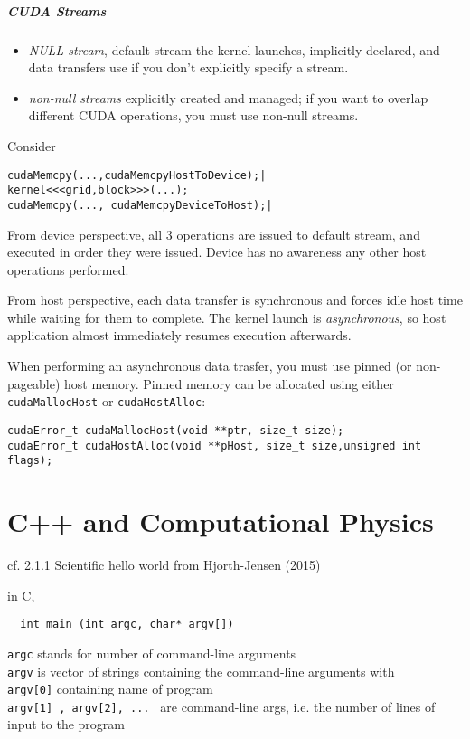 \documentclass[10pt]{amsart}
\begin{document}
\begin{multicols*}{2}
\subsubsection{CUDA Streams}
\begin{itemize}
	\item \emph{NULL stream}, default stream the kernel launches, implicitly declared, and data transfers use if you don't explicitly specify a stream.  
	\item \emph{non-null streams} explicitly created and managed; if you want to overlap different CUDA operations, you must use non-null streams.  
\end{itemize}

Consider 

\begin{lstlisting}
cudaMemcpy(...,cudaMemcpyHostToDevice);|
kernel<<<grid,block>>>(...);
cudaMemcpy(..., cudaMemcpyDeviceToHost);|
\end{lstlisting}

From device perspective, all 3 operations are issued to default stream, and executed in order they were issued.  Device has no awareness any other host operations performed.  

From host perspective, each data transfer is synchronous and forces idle host time while waiting for them to complete.  The kernel launch is \emph{asynchronous}, so host application almost immediately resumes execution afterwards.  

When performing an asynchronous data trasfer, you must use pinned (or non-pageable) host memory.  Pinned memory can be allocated using either \verb|cudaMallocHost| or \verb|cudaHostAlloc|:  

\begin{lstlisting}
cudaError_t cudaMallocHost(void **ptr, size_t size);
cudaError_t cudaHostAlloc(void **pHost, size_t size,unsigned int flags);
\end{lstlisting}







\part{C++ and Computational Physics}

cf. 2.1.1 Scientific hello world from Hjorth-Jensen (2015) \cite{Hjor2015}

in C, 
\begin{lstlisting}
  int main (int argc, char* argv[])
\end{lstlisting}
\verb|argc| stands for number of command-line arguments \\
\verb|argv| is vector of strings containing the command-line arguments with \\
\phantom{argv} \verb|argv[0]| containing name of program \\
\phantom{argv} \verb|argv[1] , argv[2], ... | are command-line args, i.e. the number of lines of input to the program


\end{multicols*}
\end{document}
